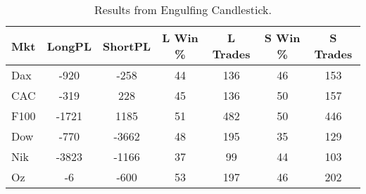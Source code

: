 \begin{table}[ht]
\centering
\caption[Engulfing Candlestick System]{Results from Engulfing Candlestick.} 
\label{tab:engulf_results}
\begin{tabular}{lcccccc}
  \toprule Mkt & LongPL & ShortPL & L Win \% & L Trades & S Win \% & S Trades \\ 
  \midrule Dax & -920 & -258 & 44 & 136 & 46 & 153 \\ 
  CAC & -319 & 228 & 45 & 136 & 50 & 157 \\ 
  F100 & -1721 & 1185 & 51 & 482 & 50 & 446 \\ 
  Dow & -770 & -3662 & 48 & 195 & 35 & 129 \\ 
  Nik & -3823 & -1166 & 37 & 99 & 44 & 103 \\ 
  Oz & -6 & -600 & 53 & 197 & 46 & 202 \\ 
   \bottomrule \end{tabular}
\end{table}
